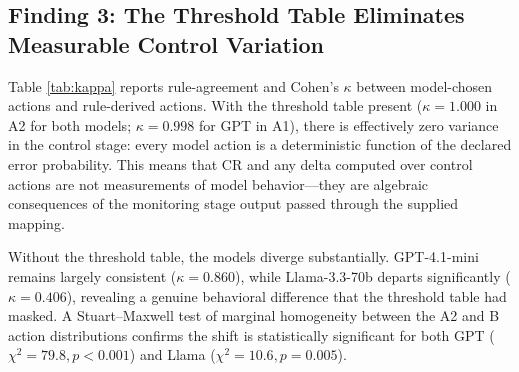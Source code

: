 \documentclass[11pt]{article}
\begin{document}
\begin{table}[h]
\centering
\small
{}
\caption{Rule-agreement between model actions and threshold-derived rule actions. $\kappa = 1.000$ in A2 is exact (perfectly diagonal, zero off-diagonal cases for both models, $n=600$). GPT shows a single deviation in A1 ($\kappa = 0.998$). Bootstrap CIs ($N=10000$) are provided for Protocol B. A Stuart--Maxwell test of marginal homogeneity between A2 and B action distributions is significant for both models ($p < 0.01$; note: Llama uses ABSTAIN zero times in B, producing a zero marginal for that row).}
\label{tab:kappa}
\end{table}

\subsection{Finding 3: The Threshold Table Eliminates Measurable Control Variation}
\label{sec:tautology}

Table \ref{tab:kappa} reports rule-agreement and Cohen's $\kappa$ between model-chosen actions and rule-derived actions. With the threshold table present ($\kappa = 1.000$ in A2 for both models; $\kappa = 0.998$ for GPT in A1), there is effectively zero variance in the control stage: every model action is a deterministic function of the declared error probability. This means that CR and any delta computed over control actions are not measurements of model behavior---they are algebraic consequences of the monitoring stage output passed through the supplied mapping.

Without the threshold table, the models diverge substantially. GPT-4.1-mini remains largely consistent ($\kappa = 0.860$), while Llama-3.3-70b departs significantly ($\kappa = 0.406$), revealing a genuine behavioral difference that the threshold table had masked. A Stuart--Maxwell test of marginal homogeneity between the A2 and B action distributions confirms the shift is statistically significant for both GPT ($\chi^2 = 79.8, p < 0.001$) and Llama ($\chi^2 = 10.6, p = 0.005$).
\end{document}
